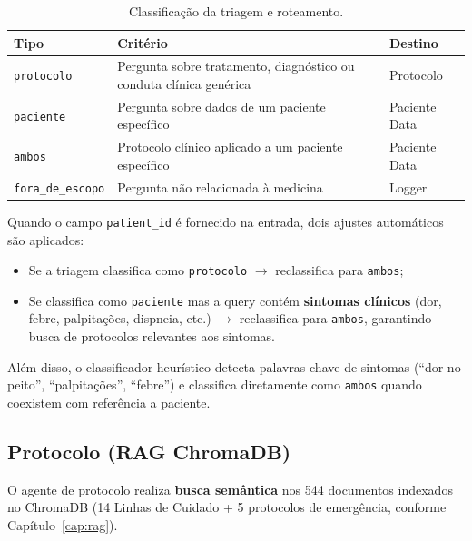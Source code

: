 \begin{table}[H]
\centering
\caption{Classificação da triagem e roteamento.}
\label{tab:triagem_routing}
\begin{tabularx}{\textwidth}{l X l}
\toprule
\textbf{Tipo} & \textbf{Critério} & \textbf{Destino} \\
\midrule
\texttt{protocolo} & Pergunta sobre tratamento, diagnóstico ou conduta clínica genérica & Protocolo \\
\texttt{paciente} & Pergunta sobre dados de um paciente específico & Paciente Data \\
\texttt{ambos} & Protocolo clínico aplicado a um paciente específico & Paciente Data \\
\texttt{fora\_de\_escopo} & Pergunta não relacionada à medicina & Logger \\
\bottomrule
\end{tabularx}
\end{table}

\begin{infobox}
Quando o campo \texttt{patient\_id} é fornecido na entrada, dois ajustes automáticos são aplicados:
\begin{itemize}
    \item Se a triagem classifica como \texttt{protocolo} $\rightarrow$ reclassifica para \texttt{ambos};
    \item Se classifica como \texttt{paciente} mas a query contém \textbf{sintomas clínicos} (dor, febre, palpitações, dispneia, etc.) $\rightarrow$ reclassifica para \texttt{ambos}, garantindo busca de protocolos relevantes aos sintomas.
\end{itemize}
Além disso, o classificador heurístico detecta palavras-chave de sintomas (``dor no peito'', ``palpitações'', ``febre'') e classifica diretamente como \texttt{ambos} quando coexistem com referência a paciente.
\end{infobox}

\subsection{Protocolo (RAG ChromaDB)}

O agente de protocolo realiza \textbf{busca semântica} nos 544 documentos indexados no ChromaDB (14 Linhas de Cuidado + 5 protocolos de emergência, conforme Capítulo~\ref{cap:rag}).

